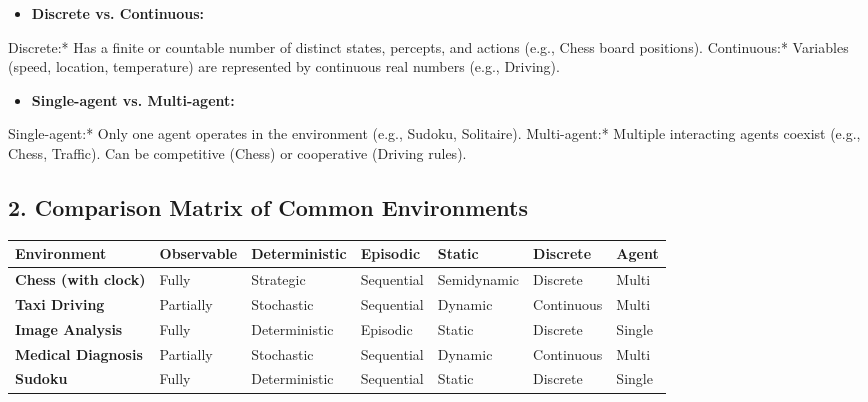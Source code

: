 \begin{itemize}
  \item   \textbf{Discrete vs. Continuous:}
\end{itemize}
    \textit{   }Discrete:* Has a finite or countable number of distinct states, percepts, and actions (e.g., Chess board positions).
    \textit{   }Continuous:* Variables (speed, location, temperature) are represented by continuous real numbers (e.g., Driving).
\begin{itemize}
  \item   \textbf{Single-agent vs. Multi-agent:}
\end{itemize}
    \textit{   }Single-agent:* Only one agent operates in the environment (e.g., Sudoku, Solitaire).
    \textit{   }Multi-agent:* Multiple interacting agents coexist (e.g., Chess, Traffic). Can be competitive (Chess) or cooperative (Driving rules).

\subsection{2. Comparison Matrix of Common Environments}

\begin{table}[H]
\centering
\begin{tabular}{|p{}|p{}|p{}|p{}|p{}|p{}|p{}|}
\hline
Environment & Observable & Deterministic & Episodic & Static & Discrete & Agent \\
\hline
\textbf{Chess (with clock)} & Fully & Strategic & Sequential & Semidynamic & Discrete & Multi \\
\hline
\textbf{Taxi Driving} & Partially & Stochastic & Sequential & Dynamic & Continuous & Multi \\
\hline
\textbf{Image Analysis} & Fully & Deterministic & Episodic & Static & Discrete & Single \\
\hline
\textbf{Medical Diagnosis} & Partially & Stochastic & Sequential & Dynamic & Continuous & Multi \\
\hline
\textbf{Sudoku} & Fully & Deterministic & Sequential & Static & Discrete & Single \\
\hline
\end{tabular}
\end{table}
